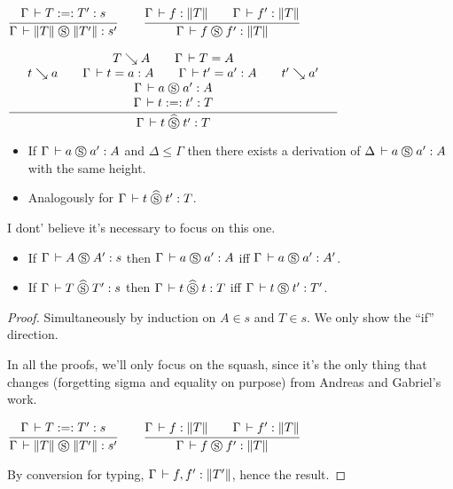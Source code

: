 \documentclass[a4paper,english]{lipics-utf8x}
\begin{document}
  \begin{center}
  \(
    \ru{\Gamma \der T :=: T' : s
      }{\Gamma \der \squash{T} \Sr \squash{T'} : s'}
    \qquad
    \ru{\Gamma \der f : \squash{T} \qquad
        \Gamma \der f' : \squash{T}
      }{\Gamma \der f \Sr f' : \squash{T}}
  \)
  \end{center}

  \begin{center}
  \(
    \qru{T \rew A \qquad
         \Gamma \der T = A
       }{t \rew a \qquad
         \Gamma \der t = a : A \qquad
         \Gamma \der t' = a' : A \qquad
         t' \rew a'
       }{\Gamma \der a \Sr a' : A
       }{\Gamma \der t :=: t' : T
       }{\Gamma \der t \hSr t' : T}
  \)
  \end{center}

  \begin{lemma}[Weakening]
    \leavevmode
    \begin{itemize}
      \item If $\Gamma \,\vdash a \mathrel{\circledS} a' : A$ and $\Delta \le \Gamma$ then there
      exists a derivation of $\Delta \,\vdash a \mathrel{\circledS} a' : A$ with the same height.
      \item Analogously for $\Gamma \,\vdash t \mathrel{\widehat{\mathrel{\circledS}}} t' : T$.
    \end{itemize}
  \end{lemma}
  I dont' believe it's necessary to focus on this one.

  \begin{lemma}
    \label{lem:s-conv}
    \leavevmode
    \begin{itemize}
      \item If $\Gamma \,\vdash A \mathrel{\circledS} A' : s$ then
      $\Gamma \,\vdash a \mathrel{\circledS} a' : A$ iff $\Gamma \,\vdash a \mathrel{\circledS} a' : A'$.
      \item If $\Gamma \,\vdash T \mathrel{\widehat{\mathrel{\circledS}}} T' : s$ then
      $\Gamma \,\vdash t \mathrel{\widehat{\mathrel{\circledS}}} t : T$ iff $\Gamma \,\vdash t \mathrel{\circledS} t' : T'$.
    \end{itemize}
  \end{lemma}

  \begin{proof}
    Simultaneously by induction on $A \in s$ and $T \in s$.
    We only show the ``if'' direction.

    In all the proofs, we'll only focus on the squash, since it's the only
    thing that changes (forgetting sigma and equality on purpose) from
    Andreas and Gabriel's work.

    \begin{center}
    \(
      \ru{\Gamma \der T :=: T' : s
        }{\Gamma \der \squash{T} \Sr \squash{T'} : s'}
      \qquad
      \ru{\Gamma \der f : \squash{T} \qquad
          \Gamma \der f' : \squash{T}
        }{\Gamma \der f \Sr f' : \squash{T}}
    \)
    \end{center}
    By conversion for typing, $\Gamma \,\vdash f, f' : \|T'\|$, hence the
    result.
  \end{proof}
\end{document}
